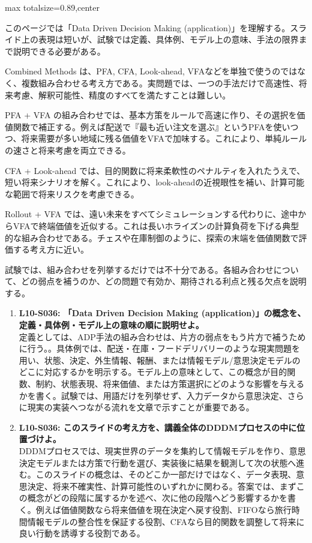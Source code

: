\begin{minipage}[t]{0.58\textwidth}
\begin{adjustbox}{max totalsize={\textwidth}{0.89\textheight},center}
\begin{minipage}{\textwidth}\scriptsize
{}このページでは「Data Driven Decision Making (application)」を理解する。スライド上の表現は短いが、試験では定義、具体例、モデル上の意味、手法の限界まで説明できる必要がある。\par
Combined Methods は、PFA, CFA, Look-ahead, VFAなどを単独で使うのではなく、複数組み合わせる考え方である。実問題では、一つの手法だけで高速性、将来考慮、解釈可能性、精度のすべてを満たすことは難しい。\par
PFA + VFA の組み合わせでは、基本方策をルールで高速に作り、その選択を価値関数で補正する。例えば配送で『最も近い注文を選ぶ』というPFAを使いつつ、将来需要が多い地域に残る価値をVFAで加味する。これにより、単純ルールの速さと将来考慮を両立できる。\par
CFA + Look-ahead では、目的関数に将来柔軟性のペナルティを入れたうえで、短い将来シナリオを解く。これにより、look-aheadの近視眼性を補い、計算可能な範囲で将来リスクを考慮できる。\par
Rollout + VFA では、遠い未来をすべてシミュレーションする代わりに、途中からVFAで終端価値を近似する。これは長いホライズンの計算負荷を下げる典型的な組み合わせである。チェスや在庫制御のように、探索の末端を価値関数で評価する考え方に近い。\par
試験では、組み合わせを列挙するだけでは不十分である。各組み合わせについて、どの弱点を補うのか、どの問題で有効か、期待される利点と残る欠点を説明する。\par{}\begin{enumerate}\item \textbf{L10-S036: 「Data Driven Decision Making (application)」の概念を、定義・具体例・モデル上の意味の順に説明せよ。}\\定義としては、ADP手法の組み合わせは、片方の弱点をもう片方で補うために行う。。具体例では、配送・在庫・フードデリバリーのような現実問題を用い、状態、決定、外生情報、報酬、または情報モデル/意思決定モデルのどこに対応するかを明示する。モデル上の意味として、この概念が目的関数、制約、状態表現、将来価値、または方策選択にどのような影響を与えるかを書く。試験では、用語だけを列挙せず、入力データから意思決定、さらに現実の実装へつながる流れを文章で示すことが重要である。\item \textbf{L10-S036: このスライドの考え方を、講義全体のDDDMプロセスの中に位置づけよ。}\\DDDMプロセスでは、現実世界のデータを集約して情報モデルを作り、意思決定モデルまたは方策で行動を選び、実装後に結果を観測して次の状態へ進む。このスライドの概念は、そのどこか一部だけではなく、データ表現、意思決定、将来不確実性、計算可能性のいずれかに関わる。答案では、まずこの概念がどの段階に属するかを述べ、次に他の段階へどう影響するかを書く。例えば価値関数なら将来価値を現在決定へ戻す役割、FIFOなら旅行時間情報モデルの整合性を保証する役割、CFAなら目的関数を調整して将来に良い行動を誘導する役割である。\end{enumerate}
\end{minipage}
\end{adjustbox}
\end{minipage}
